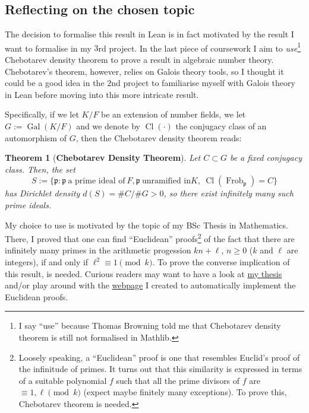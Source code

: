\documentclass[a4paper,11pt]{article}
\theoremstyle{plain}
\newtheorem{theorem}{Theorem}
\DeclareMathOperator{\Gal}{Gal} %
\DeclareMathOperator{\Cl}{Cl} %
\DeclareMathOperator{\Frob}{Frob} %
\begin{document}
		\subsection{Reflecting on the chosen topic}
		
		The decision to formalise this result in Lean is in fact motivated by the result I want to formalise in my $3$rd project. In the last piece of coursework I aim to \emph{use}\footnote{I say ``use'' because Thomas Browning told me that Chebotarev density theorem is still not formalised in Mathlib.} Chebotarev density theorem to prove a result in algebraic number theory. Chebotarev's theorem, however, relies on Galois theory tools, so I thought it could be a good idea in the $2$nd project to familiarise myself with Galois theory in Lean before moving into this more intricate result.
		
		Specifically, if we let $K/F$ be an extension of number fields, we let $G:=\Gal(K/F)$ and we denote by $\Cl(\cdot)$ the conjugacy class of an automorphism of $G$, then the Chebotarev density theorem reads:
		
		\begin{theorem}[\textbf{Chebotarev Density Theorem}]\label{th:Chebo}
			Let $C\subset G$ be a fixed conjugacy class. Then, the set 
			\begin{equation*}
				S:=\{\mathfrak{p}: \mathfrak{p} \ \text{a prime ideal of} \ F, \mathfrak{p} \ \text{unramified in} K, \ \Cl(\Frob_\mathfrak{p})=C\}
			\end{equation*}
			has Dirichlet density $d(S)=\# C/\# G>0$, so there exist infinitely many such prime ideals.
		\end{theorem}
		
		My choice to use  is motivated by the topic of my BSc Thesis in Mathematics. There, I proved that one can find ``Euclidean'' proofs\footnote{Loosely speaking, a ``Euclidean'' proof is one that resembles Euclid's proof of the infinitude of primes. It turns out that this similarity is expressed in terms of a suitable polynomial $f$ such that all the prime divisors of $f$ are $\equiv1,\ell\pmod{k}$ (expect maybe finitely many exceptions). To prove this, Chebotarev theorem is needed.} of the fact that there are infinitely many primes in the arithmetic progession $kn+\ell$, $n\geqslant 0$ ($k$ and $\ell$ are integers), if and only if $\ell^2\equiv 1\pmod{k}$. To prove the converse implication of this result,  is needed. Curious readers may want to have a look at \href{https://github.com/joarca01/final-math-bsc-thesis/blob/main/Thesis-document/Thesis.pdf}{my thesis} and/or play around with the \href{https://mat.uab.cat/~masdeu/teaching/misc/euclid.php}{webpage} I created to automatically implement the Euclidean proofs.
		
\end{document}
